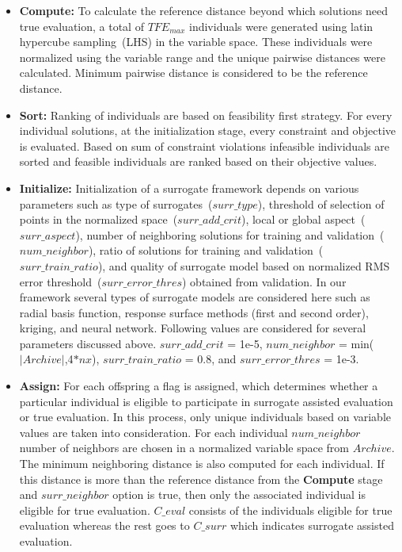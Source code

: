 \begin{itemize}  
	
	\item \textbf{Compute:} To calculate the reference distance beyond which solutions need true evaluation, a total of $TFE_{max}$ individuals were generated using latin hypercube sampling~(LHS) in the variable space. These individuals were normalized using the variable range and the unique pairwise distances were calculated. Minimum pairwise distance is considered to be the reference distance.
	
	\item \textbf{Sort:} Ranking of individuals are based on feasibility first strategy. For every individual solutions, at the initialization stage, every constraint and objective is evaluated. Based on sum of constraint violations infeasible individuals are sorted and feasible individuals are ranked based on their objective values.   
	
	\item \textbf{Initialize:} Initialization of a surrogate framework depends on various parameters such as type of surrogates~($surr\_type$), threshold of selection of points in the normalized space~($surr\_add\_crit$), local or global aspect~($surr\_aspect$), number of neighboring solutions for training and validation~($num\_neighbor$), ratio of solutions for training and validation~($surr\_train\_ratio$), and quality of surrogate model based on normalized RMS error threshold~($surr\_error\_thres$) obtained from validation. In our framework several types of surrogate models are considered here such as radial basis function, response surface methods (first and second order), kriging, and neural network. Following values are considered for several parameters discussed above. $surr\_add\_crit$ = 1e-5, $num\_neighbor$ = min($\left|Archive\right|$,4$*nx$), $surr\_train\_ratio$ = 0.8, and $surr\_error\_thres$ = 1e-3. 
	
	\item \textbf{Assign:} For each offspring a flag is assigned, which determines whether a particular individual is eligible to participate in surrogate assisted evaluation or true evaluation. In this process, only unique individuals based on variable values are taken into consideration. For each individual $num\_neighbor$ number of neighbors are chosen in a normalized variable space from $Archive$. The minimum neighboring distance is also computed for each individual. If this distance is more than the reference distance from the \textbf{Compute} stage and $surr\_neighbor$ option is true, then only the associated individual is eligible for true evaluation. $C\_eval$ consists of the individuals eligible for true evaluation whereas the rest goes to $C\_surr$ which indicates surrogate assisted evaluation. 
	

\end{itemize}
